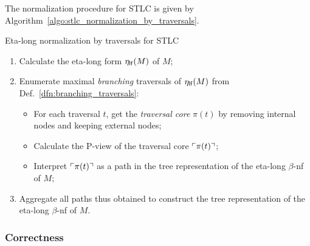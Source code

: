 \documentclass{article}
\theoremstyle{plain}
\theoremstyle{definition}
\theoremstyle{remark}
\def\coresymbol{\pi} %
\newcommand{\core}[1]{\coresymbol(#1)} %
\begin{document}
The normalization procedure for STLC is given by Algorithm~\ref{algo:stlc_normalization_by_traversals}.

\begin{algorithm}[!ht]
\caption{Eta-long normalization by traversals for STLC}
\label{algo:stlc_normalization_by_traversals}
\begin{algorithmic}
\begin{enumerate}
  \item Calculate the eta-long form $\eta_{\sf lf}(M)$ of $M$;
  \item Enumerate maximal \emph{branching} traversals of $\eta_{\sf lf}(M)$ from Def.~\ref{dfn:branching_traversals}:
  \begin{itemize}
  \item For each traversal $t$, get the \emph{traversal core} $\core{t}$ by removing internal nodes and keeping external nodes;
  \item Calculate the P-view of the traversal core $\pview{\core{t}}$;
  \item Interpret $\pview{\core{t}}$ as a path in the tree representation of the eta-long $\beta$-nf of $M$;
  \end{itemize}
  \item Aggregate all paths thus obtained to construct the tree representation of the eta-long $\beta$-nf of $M$.
\end{enumerate}
\end{algorithmic}
\end{algorithm}

\subsubsection*{Correctness}


\end{document}
